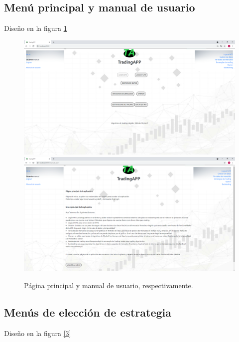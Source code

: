 \subsection{Menú principal y manual de usuario}
Diseño en la figura \ref{2}

\begin{figure}[h]
	\includegraphics[width=1.2\textwidth]{imagenes/diseno_final/menu_principal.png}\newline \\
	\includegraphics[width=1.2\textwidth]{imagenes/diseno_final/manual_usuario.png}

	\caption{Página principal y manual de usuario, respectivamente.}  \label{2}
\end{figure}

\subsection{Menús de elección de estrategia}
Diseño en la figura \ref{3}

